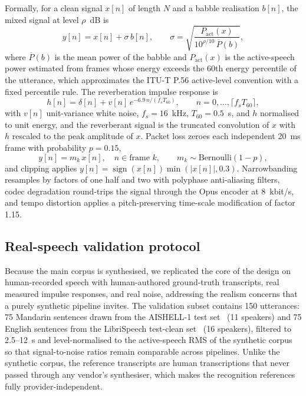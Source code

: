 Formally, for a clean signal $x[n]$ of length $N$ and a babble realisation
$b[n]$, the mixed signal at level $\rho$~dB is
\begin{equation}
y[n] = x[n] + \sigma\, b[n], \qquad
\sigma = \sqrt{\frac{P_{\mathrm{act}}(x)}{10^{\rho/10}\, \overline{P}(b)}},
\label{eq:snr}
\end{equation}
where $\overline{P}(b)$ is the mean power of the babble and
$P_{\mathrm{act}}(x)$ is the active-speech power estimated from frames whose
energy exceeds the 60th energy percentile of the utterance, which
approximates the ITU-T P.56 active-level convention with a fixed percentile
rule. The reverberation impulse response is
\begin{equation}
h[n] = \delta[n] + v[n]\, e^{-6.9\, n / (f_s T_{60})}, \qquad n = 0, \dots,
\lceil f_s T_{60} \rceil,
\label{eq:rir}
\end{equation}
with $v[n]$ unit-variance white noise, $f_s = 16$~kHz, $T_{60} = 0.5$~s, and
$h$ normalised to unit energy, and the reverberant signal is the truncated
convolution of $x$ with $h$ rescaled to the peak amplitude of $x$. Packet
loss zeroes each independent 20~ms frame with probability $p = 0.15$,
\begin{equation}
y[n] = m_k\, x[n], \quad n \in \text{frame } k, \qquad m_k \sim
\mathrm{Bernoulli}(1 - p),
\label{eq:pl}
\end{equation}
and clipping applies $y[n] = \operatorname{sign}(x[n]) \min(|x[n]|, 0.3)$.
Narrowbanding resamples by factors of one half and two with polyphase
anti-aliasing filters, codec degradation round-trips the signal through the
Opus encoder at 8~kbit/s, and tempo distortion applies a pitch-preserving
time-scale modification of factor 1.15.

\subsection{Real-speech validation protocol}
\label{sec:methods:real}

Because the main corpus is synthesised, we replicated the core of the
design on human-recorded speech with human-authored ground-truth
transcripts, real measured impulse responses, and real noise, addressing
the realism concerns that a purely synthetic pipeline invites. The
validation subset contains 150 utterances: 75 Mandarin sentences drawn
from the AISHELL-1 test set~\cite{bu2017aishell} (11 speakers) and 75
English sentences from the LibriSpeech test-clean
set~\cite{panayotov2015librispeech} (16 speakers), filtered to 2.5--12~s
and level-normalised to the active-speech RMS of the synthetic corpus so
that signal-to-noise ratios remain comparable across pipelines. Unlike the
synthetic corpus, the reference transcripts are human transcriptions that
never passed through any vendor's synthesiser, which makes the recognition
references fully provider-independent.

